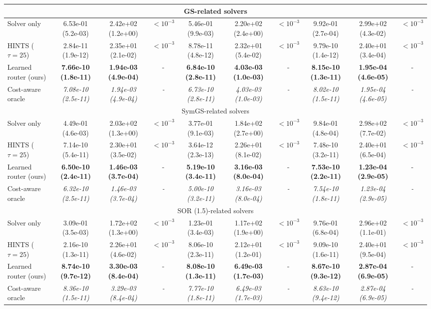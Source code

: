 {\begin{tabular}{lccccccccc}
\midrule
\multicolumn{10}{c}{GS-related solvers} \\ \midrule
Solver only & 6.53e-01 (5.2e-03) & 2.42e+02 (1.2e+00) & $<10^{-3}$ & 5.46e-01 (9.9e-03) & 2.20e+02 (2.4e+00) & $<10^{-3}$ & 9.92e-01 (2.7e-04) & 2.99e+02 (4.3e-02) & $<10^{-3}$ \\
HINTS ($\tau{=}25$) & 2.84e-11 (1.9e-12) & 2.35e+01 (2.1e-02) & $<10^{-3}$ & 8.78e-11 (4.8e-12) & 2.32e+01 (5.4e-02) & $<10^{-3}$ & 9.79e-10 (1.4e-12) & 2.40e+01 (3.4e-04) & $<10^{-3}$ \\
Learned router (ours) & \textbf{7.66e-10 (1.8e-11)} & \textbf{1.94e-03 (4.9e-04)} & - & \textbf{6.84e-10 (2.8e-11)} & \textbf{4.03e-03 (1.0e-03)} & - & \textbf{8.15e-10 (1.3e-11)} & \textbf{1.95e-04 (4.6e-05)} & - \\
Cost-aware oracle & \textit{7.08e-10 (2.5e-11)} & \textit{1.94e-03 (4.9e-04)} & \textit{-} & \textit{6.73e-10 (2.8e-11)} & \textit{4.03e-03 (1.0e-03)} & \textit{-} & \textit{8.02e-10 (1.5e-11)} & \textit{1.95e-04 (4.6e-05)} & \textit{-} \\
\midrule
\multicolumn{10}{c}{SymGS-related solvers} \\ \midrule
Solver only & 4.49e-01 (4.6e-03) & 2.03e+02 (1.3e+00) & $<10^{-3}$ & 3.77e-01 (9.1e-03) & 1.84e+02 (2.7e+00) & $<10^{-3}$ & 9.84e-01 (4.8e-04) & 2.98e+02 (7.7e-02) & $<10^{-3}$ \\
HINTS ($\tau{=}25$) & 7.14e-10 (5.4e-11) & 2.30e+01 (3.5e-02) & $<10^{-3}$ & 3.64e-12 (2.3e-13) & 2.26e+01 (8.1e-02) & $<10^{-3}$ & 7.48e-10 (3.2e-11) & 2.40e+01 (6.5e-04) & $<10^{-3}$ \\
Learned router (ours) & \textbf{6.50e-10 (2.4e-11)} & \textbf{1.46e-03 (3.7e-04)} & - & \textbf{5.19e-10 (3.4e-11)} & \textbf{3.16e-03 (8.0e-04)} & - & \textbf{7.53e-10 (2.2e-11)} & \textbf{1.23e-04 (2.9e-05)} & - \\
Cost-aware oracle & \textit{6.32e-10 (2.5e-11)} & \textit{1.46e-03 (3.7e-04)} & \textit{-} & \textit{5.00e-10 (3.2e-11)} & \textit{3.16e-03 (8.0e-04)} & \textit{-} & \textit{7.54e-10 (1.8e-11)} & \textit{1.23e-04 (2.9e-05)} & \textit{-} \\
\midrule
\multicolumn{10}{c}{SOR (1.5)-related solvers} \\ \midrule
Solver only & 3.09e-01 (3.5e-03) & 1.72e+02 (1.3e+00) & $<10^{-3}$ & 1.23e-01 (3.4e-03) & 1.17e+02 (1.9e+00) & $<10^{-3}$ & 9.76e-01 (6.8e-04) & 2.96e+02 (1.1e-01) & $<10^{-3}$ \\
HINTS ($\tau{=}25$) & 2.16e-10 (1.3e-11) & 2.26e+01 (4.6e-02) & $<10^{-3}$ & 8.06e-10 (2.3e-11) & 2.12e+01 (1.2e-01) & $<10^{-3}$ & 9.09e-10 (1.6e-11) & 2.40e+01 (9.5e-04) & $<10^{-3}$ \\
Learned router (ours) & \textbf{8.74e-10 (9.7e-12)} & \textbf{3.30e-03 (8.4e-04)} & - & \textbf{8.08e-10 (1.3e-11)} & \textbf{6.49e-03 (1.7e-03)} & - & \textbf{8.67e-10 (9.3e-12)} & \textbf{2.87e-04 (6.9e-05)} & - \\
Cost-aware oracle & \textit{8.36e-10 (1.5e-11)} & \textit{3.29e-03 (8.4e-04)} & \textit{-} & \textit{7.77e-10 (1.8e-11)} & \textit{6.49e-03 (1.7e-03)} & \textit{-} & \textit{8.63e-10 (9.4e-12)} & \textit{2.87e-04 (6.9e-05)} & \textit{-} \\
\bottomrule
\end{tabular}}
